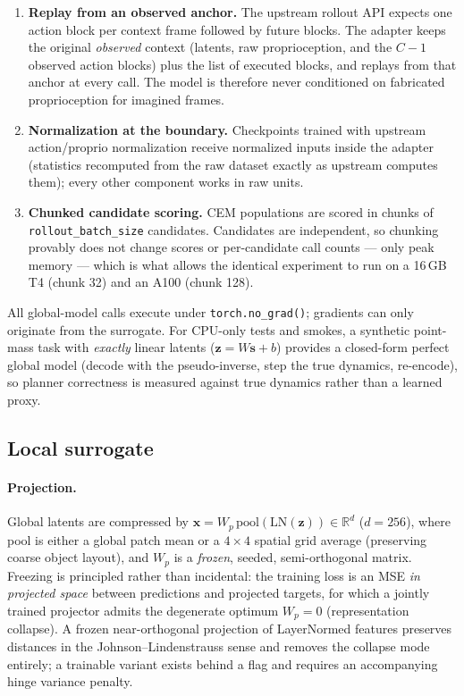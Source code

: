 \documentclass[11pt,a4paper]{article}
\newcommand{\zlat}{\mathbf{z}}
\newcommand{\xloc}{\mathbf{x}}
\begin{document}
\begin{enumerate}[leftmargin=1.4em]
  \item \textbf{Replay from an observed anchor.} The upstream rollout API
        expects one action block per context frame followed by future blocks.
        The adapter keeps the original \emph{observed} context (latents, raw
        proprioception, and the $C{-}1$ observed action blocks) plus the list
        of executed blocks, and replays from that anchor at every call. The
        model is therefore never conditioned on fabricated proprioception for
        imagined frames.
  \item \textbf{Normalization at the boundary.} Checkpoints trained with
        upstream action/proprio normalization receive normalized inputs inside
        the adapter (statistics recomputed from the raw dataset exactly as
        upstream computes them); every other component works in raw units.
  \item \textbf{Chunked candidate scoring.} CEM populations are scored in
        chunks of \texttt{rollout\_batch\_size} candidates. Candidates are
        independent, so chunking provably does not change scores or
        per-candidate call counts --- only peak memory --- which is what allows
        the identical experiment to run on a 16\,GB T4 (chunk 32) and an A100
        (chunk 128).
\end{enumerate}
All global-model calls execute under \texttt{torch.no\_grad()}; gradients can
only originate from the surrogate. For CPU-only tests and smokes, a synthetic
point-mass task with \emph{exactly} linear latents ($\zlat = W\mathbf{s} + b$)
provides a closed-form perfect global model (decode with the pseudo-inverse,
step the true dynamics, re-encode), so planner correctness is measured against
true dynamics rather than a learned proxy.

\subsection{Local surrogate}
\label{sec:local}

\paragraph{Projection.} Global latents are compressed by
$\xloc = W_{\!p}\,\mathrm{pool}(\mathrm{LN}(\zlat)) \in \mathbb{R}^{d}$
($d{=}256$), where pool is either a global patch mean or a $4{\times}4$
spatial grid average (preserving coarse object layout), and $W_{\!p}$ is a
\emph{frozen}, seeded, semi-orthogonal matrix. Freezing is principled rather
than incidental: the training loss is an MSE \emph{in projected space} between
predictions and projected targets, for which a jointly trained projector
admits the degenerate optimum $W_{\!p}{=}0$ (representation collapse). A
frozen near-orthogonal projection of LayerNormed features preserves distances
in the Johnson--Lindenstrauss sense and removes the collapse mode entirely; a
trainable variant exists behind a flag and requires an accompanying hinge
variance penalty.
\end{document}
